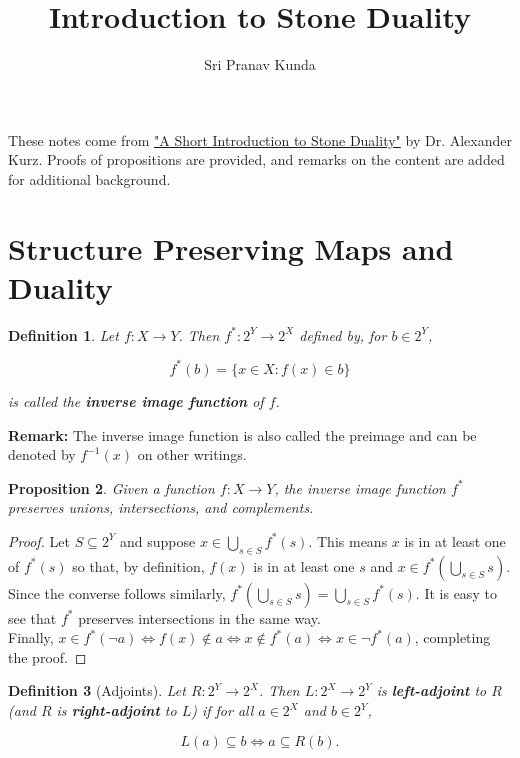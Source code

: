 \documentclass{article}
\title{Introduction to Stone Duality}
\author{Sri Pranav Kunda}
\date{}
\newtheorem{proposition}{Proposition}[section]
\newtheorem{definition}[proposition]{Definition}
\begin{document}
\maketitle

These notes come from \href{https://hackmd.io/@alexhkurz/S1W8SC0Tc}{"A Short Introduction to Stone Duality"} by Dr. Alexander Kurz. Proofs of propositions are provided, and remarks on the content are added for additional background. 


\section{Structure Preserving Maps and Duality}

\begin{definition}
Let $f : X \to Y$. Then $f^* : 2^Y \to 2^X$ defined by, for $b \in 2^Y$,

$$f^*(b) = \{x \in X: f(x) \in b\}$$

is called the \textbf{inverse image function} of $f$.
\end{definition}

\textbf{Remark: } The inverse image function is also called the preimage and can be denoted by $f^{-1}(x)$ on other writings. 

\begin{proposition}\label{thm:inv-image-preserves-structure}
Given a function $f : X \to Y$, the inverse image function $f^*$ preserves unions, intersections, and complements. 
\end{proposition}

\begin{proof}
Let $S \subseteq 2^Y$ and suppose $x \in \bigcup_{s \in S} f^*(s)$. This means $x$ is in at least one of $f^*(s)$ so that, by definition, $f(x)$ is in at least one $s$ and $x \in f^*(\bigcup_{s \in S} s)$. \\

Since the converse follows similarly, $f^*(\bigcup_{s \in S} s) = \bigcup_{s \in S} f^*(s)$. It is easy to see that $f^*$ preserves intersections in the same way. \\

Finally, $x \in f^*(\neg a) \Longleftrightarrow f(x) \not\in a \Longleftrightarrow x \not\in f^*(a) \Longleftrightarrow x \in \neg f^*(a)$, completing the proof.
\end{proof}

\begin{definition}[Adjoints]
Let $R : 2^Y \to 2^X$. Then $L : 2^X \to 2^Y$ is \textbf{left-adjoint} to $R$ (and $R$ is \textbf{right-adjoint} to $L$) if for all $a \in 2^X$ and $b \in 2^Y$,

\begin{equation} \label{eq:ajdoints}
L(a) \subseteq b \Longleftrightarrow a \subseteq R(b).
\end{equation}
\end{definition}
\end{document}
